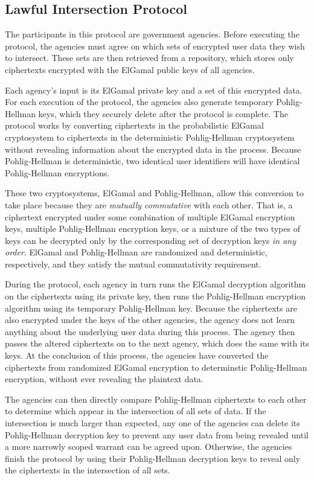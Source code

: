 \subsection{Lawful Intersection Protocol}\label{sec-isectproto}

The participants in this
protocol are government agencies. Before executing the protocol, the 
agencies must agree on which sets of encrypted user data they wish to 
intersect. These sets are then retrieved from a repository, which stores 
only ciphertexts encrypted with the ElGamal public keys of all agencies.

Each agency's input is its ElGamal private key and a set of this encrypted
data. For each execution of the protocol, the agencies also generate temporary 
Pohlig-Hellman keys, which they securely delete after the protocol is complete. 
The protocol works by converting ciphertexts in the probabilistic ElGamal 
cryptosystem to ciphertexts in the deterministic Pohlig-Hellman 
cryptosystem without revealing information about the encrypted data in the 
process. Because Pohlig-Hellman is deterministic, two identical user 
identifiers will have identical Pohlig-Hellman encryptions.

These two cryptosystems, ElGamal and Pohlig-Hellman, allow this 
conversion to take place because they are \emph{mutually commutative} with 
each other. That is, a ciphertext encrypted under some combination of 
multiple ElGamal encryption keys, multiple Pohlig-Hellman encryption keys, 
or a mixture of the two types of keys can be decrypted only by the 
corresponding set of decryption keys \emph{in any order}. ElGamal and 
Pohlig-Hellman are randomized and deterministic, respectively, and they 
satisfy the mutual commutativity requirement.

During the protocol, each agency in turn runs the ElGamal decryption 
algorithm on the ciphertexts using its private key, then runs the 
Pohlig-Hellman encryption algorithm using its temporary Pohlig-Hellman key. 
Because the ciphertexts are also encrypted under the keys of the other 
agencies, the agency does not learn anything about the underlying user 
data during this process. The agency then passes the altered ciphertexts on 
to the next agency, which does the same with its keys. At the conclusion of 
this process, the agencies have converted the ciphertexts from randomized 
ElGamal encryption to determinstic Pohlig-Hellman encryption, without 
ever revealing the plaintext data.

The agencies can then directly compare Pohlig-Hellman ciphertexts to each 
other to determine which appear in the intersection of all sets of data. 
If the intersection is much larger than expected, any one of the agencies can 
delete its Pohlig-Hellman decryption key to prevent any user data from being 
revealed until a more narrowly scoped warrant can be agreed upon. Otherwise, 
the agencies finish the protocol by using their Pohlig-Hellman decryption keys 
to reveal only the ciphertexts in the intersection of all sets.

